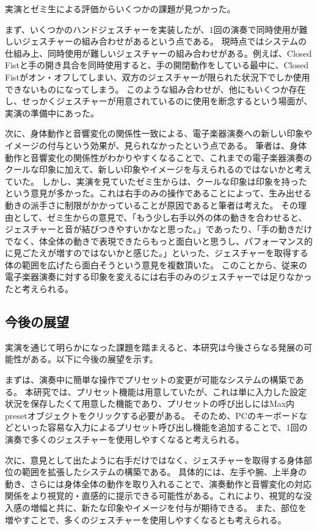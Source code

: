 実演とゼミ生による評価からいくつかの課題が見つかった。

まず、いくつかのハンドジェスチャーを実装したが、1回の演奏で同時使用が難しいジェスチャーの組み合わせがあるという点である。
現時点ではシステムの仕組み上、同時使用が難しいジェスチャーの組み合わせがある。例えば、Closed Fistと手の開き具合を同時使用すると、手の開閉動作をしている最中に、Closed Fistがオン・オフしてしまい、双方のジェスチャーが限られた状況下でしか使用できないものになってしまう。
このような組み合わせが、他にもいくつか存在し、せっかくジェスチャーが用意されているのに使用を断念するという場面が、実演の準備中にあった。

次に、身体動作と音響変化の関係性一致による、電子楽器演奏への新しい印象やイメージの付与という効果が、見られなかったという点である。
筆者は、身体動作と音響変化の関係性がわかりやすくなることで、これまでの電子楽器演奏のクールな印象に加えて、新しい印象やイメージを与えられるのではないかと考えていた。
しかし、実演を見ていたゼミ生からは、クールな印象は印象を持ったという意見が多かった。これは右手のみの操作であることによって、生み出せる動きの派手さに制限がかかっていることが原因であると筆者は考えた。
その理由として、ゼミ生からの意見で、「もう少し右手以外の体の動きを合わせると、ジェスチャーと音が結びつきやすいかなと思った。」であったり、「手の動きだけでなく、体全体の動きで表現できたらもっと面白いと思うし、パフォーマンス的に見ごたえが増すのではないかと感じた。」といった、ジェスチャーを取得する体の範囲を広げたら面白そうという意見を複数頂いた。
このことから、従来の電子楽器演奏に対する印象を変えるには右手のみのジェスチャーでは足りなかったと考えられる。


\subsection{今後の展望}
実演を通じて明らかになった課題を踏まえると、本研究は今後さらなる発展の可能性がある。以下に今後の展望を示す。

まずは、演奏中に簡単な操作でプリセットの変更が可能なシステムの構築である。
本研究では、プリセット機能は用意していたが、これは単に入力した設定状況を保存したくて用意した機能であり、プリセットの呼び出しにはMax内presetオブジェクトをクリックする必要がある。
そのため、PCのキーボードなどといった容易な入力によるプリセット呼び出し機能を追加することで、1回の演奏で多くのジェスチャーを使用しやすくなると考えられる。

次に、意見として出たように右手だけではなく、ジェスチャーを取得する身体部位の範囲を拡張したシステムの構築である。
具体的には、左手や腕、上半身の動き、さらには身体全体の動作を取り入れることで、演奏動作と音響変化の対応関係をより視覚的・直感的に提示できる可能性がある。これにより、視覚的な没入感の増幅と共に、新たな印象やイメージを付与が期待できる。
また、部位を増やすことで、多くのジェスチャーを使用しやすくなるとも考えられる。

